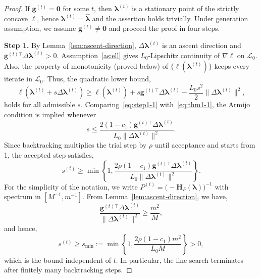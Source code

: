 \begin{proof}
    If $\mathbf{g}^{(t)}=\bm{0}$ for some $t$, then $\bm{\lambda}^{(t)}$ is a stationary point of the strictly concave $\ell$, hence $\bm{\lambda}^{(t)}=\hat{\bm{\lambda}}$ and the assertion holds trivially. Under generation assumption, we assume $\mathbf{g}^{(t)}\neq \bm{0}$ and proceed the proof in four steps.
    \medskip

    \noindent\textbf{Step 1.} By Lemma~\ref{lem:ascent-direction}, $\Delta\bm{\lambda}^{(t)}$ is an ascent direction and $\mathbf{g}^{(t)\top}\Delta\bm{\lambda}^{(t)}>0$. Assumption~\ref{as:ell} gives $L_{0}$-Lipschitz continuity of $\nabla\ell$ on $\mathcal{L}_{0}$. Also, the property of monotonicity (proved below) of $\{\ell(\bm{\lambda}^{(t)})\}$ keeps every iterate in $\mathcal{L}_{0}$. Thus, the quadratic lower bound,
    \begin{equation}
        \ell(\bm{\lambda}^{(t)}+s\Delta \bm{\lambda}^{(t)})\geq \ell(\bm{\lambda}^{(t)})+s\mathbf{g}^{(t)\top}\Delta \bm{\lambda}^{(t)}-\frac{L_{0}s^{2}}{2}\|\Delta \bm{\lambda}^{(t)}\|^{2},
        \label{eq:step1-1}
    \end{equation}
    holds for all admissible $s$. Comparing~\eqref{eq:step1-1} with~\eqref{eq:thm1-1}, the Armijo condition is implied whenever 
    \begin{equation}
        s\leq \frac{2(1-c_{1})\mathbf{g}^{(t)\top}\Delta \bm{\lambda}^{(t)}}{L_{0}\|\Delta \bm{\lambda}^{(t)}\|^{2}}.
        \label{eq:step1-2}
    \end{equation}
    Since backtracking multiplies the trial step by $\rho$ until acceptance and starts from 1, the accepted step satisfies,
    \begin{equation}
        s^{(t)}\geq \min \left\{1,\frac{2\rho(1-c_{1})\mathbf{g}^{(t)\top}\Delta \bm{\lambda}^{(t)}}{L_{0}\|\Delta \bm{\lambda}^{(t)}\|^{2}}\right\}.
        \label{eq:step1-3}
    \end{equation}
    For the simplicity of the notation, we write $P^{(t)}=\bigl(-\mathbf{H}_{P}(\bm{\lambda})\bigr)^{-1}$ with spectrum in $[M^{-1},m^{-1}]$. From Lemma~\ref{lem:ascent-direction}, we have,
    \begin{equation}
        \frac{\mathbf{g}^{(t)\top}\Delta\bm{\lambda}^{(t)}}{\|\Delta\bm{\lambda}^{(t)}\|^{2}}\geq\frac{m^{2}}{M},
        \label{eq:step1-4}
    \end{equation}
    and hence,
    \begin{equation}
        s^{(t)}\geq s_{\min} :=\min \left\{1,\frac{2\rho(1-c_{1})m^{2}}{L_{0}M}\right\}>0,
        \label{eq:step1-5}
    \end{equation}
    which is the bound independent of $t$. In particular, the line search terminates after finitely many backtracking steps.
    \medskip


\end{proof}
